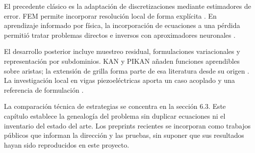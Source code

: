 El precedente clásico es la adaptación de discretizaciones mediante estimadores de error. FEM permite incorporar resolución local de forma explícita \cite{dorfler1996}. En aprendizaje informado por física, la incorporación de ecuaciones a una pérdida permitió tratar problemas directos e inversos con aproximadores neuronales \cite{lagaris1998,raissi2019}.

El desarrollo posterior incluye muestreo residual, formulaciones variacionales y representación por subdominios. KAN y PIKAN añaden funciones aprendibles sobre aristas; la extensión de grilla forma parte de esa literatura desde su origen \cite{liu2024kan}. La investigación local en vigas piezoeléctricas aporta un caso acoplado y una referencia de formulación \cite{gonzalez2026pinnpiezo}.

La comparación técnica de estrategias se concentra en la sección 6.3. Este capítulo establece la genealogía del problema sin duplicar ecuaciones ni el inventario del estado del arte. Los preprints recientes se incorporan como trabajos públicos que informan la dirección y las pruebas, sin suponer que sus resultados hayan sido reproducidos en este proyecto.
